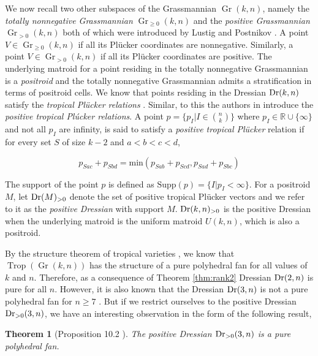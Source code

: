 \documentclass[12pt]{article}
\DeclareMathOperator{\Dr}{\rm Dr}
\DeclareMathOperator{\Trop}{Trop}
\theoremstyle{plain}
\newtheorem{theorem}{Theorem}
\theoremstyle{definition}
\numberwithin{subcase}{case}
\DeclareMathOperator{\Gr}{Gr}
\begin{document}
We now recall two other subspaces of the Grassmannian $\Gr(k,n)$, namely the \emph{totally nonnegative Grassmannian} $\Gr_{\geq 0}(k,n)$ and the \emph{positive Grassmannian} $\Gr_{> 0}(k,n)$ both of which were introduced by Lustig \cite{lusztig1994total} and Postnikov \cite{postnikov2006total}. A point $V \in \Gr_{\geq 0}(k,n)$ if all its Plücker coordinates are nonnegative. Similarly, a point $V \in \Gr_{> 0}(k,n)$ if all its Plücker coordinates are positive. The underlying matroid for a point residing in the totally nonnegative Grassmannian is a \emph{positroid} and the totally nonnegative Grassmannian admits a stratification in terms of positroid cells. We know that points residing in the Dressian $\Dr(k,n)$ satisfy the \emph{tropical Plücker relations} \cite{speyer2008linear_spaces}. Similar, to this the authors in \cite{arkani2021positive} introduce the \emph{positive tropical Plúcker relations}. A point $p = \{p_{I} | I \in \binom{n}{k} \}$ where $p_{I} \in \mathbb{R} \cup \{\infty\}$ and not all $p_{I}$ are infinity, is said to satisfy a \emph{positive tropical Plücker} relation if for every set $S$ of size $k-2$ and $a < b < c < d$,

\[ p_{Sac} + p_{Sbd} = \text{min}(p_{Sab} + p_{Scd}, p_{Sad} + p_{Sbc}) \]

The support of the point $p$ is defined as $\text{Supp}(p) = \{ I | p_{I} < \infty \}$. For a positroid $M$, let $\Dr(M)_{ > 0}$ denote the set of positive tropical Plücker vectors and we refer to it as the \emph{positive Dressian} with support $M$. $\Dr(k,n)_{ > 0}$ is the positive Dressian when the underlying matroid is the uniform matroid $U(k,n)$, which is also a positroid.



By the structure theorem of tropical varieties \cite{maclagan2021introduction}, we know that $\Trop(\Gr(k,n))$ has the structure of a pure polyhedral fan for all values of $k$ and $n$. Therefore, as a consequence of Theorem \ref{thm:rank2} Dressian $\Dr(2,n)$ is pure for all $n$. However, it is also known that the Dressian $\Dr(3,n)$ is not a pure polyhedral fan for $n \geq 7$ \cite{herrmann2009draw}. But if we restrict ourselves to the positive Dressian $\Dr_{> 0}(3,n)$, we have an interesting observation in the form of the following result,

\begin{theorem}[Proposition 10.2 \cite{arkani2021positive}]\label{thm:dress_pure}
The positive Dressian $\Dr_{> 0}(3,n)$ is a pure polyhedral fan.
\end{theorem}
\end{document}
